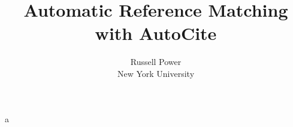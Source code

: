 \documentclass[letterpaper,twocolumn,10pt]{article}
\newcommand{\name}{AutoCite\xspace}
\begin{document}
\date{}a

\title{\sffamily\bfseries Automatic Reference Matching with {\name}}
\author{Russell Power \\ New York University}

 
\maketitle







\begin{footnotesize}


\end{footnotesize}
\end{document}
